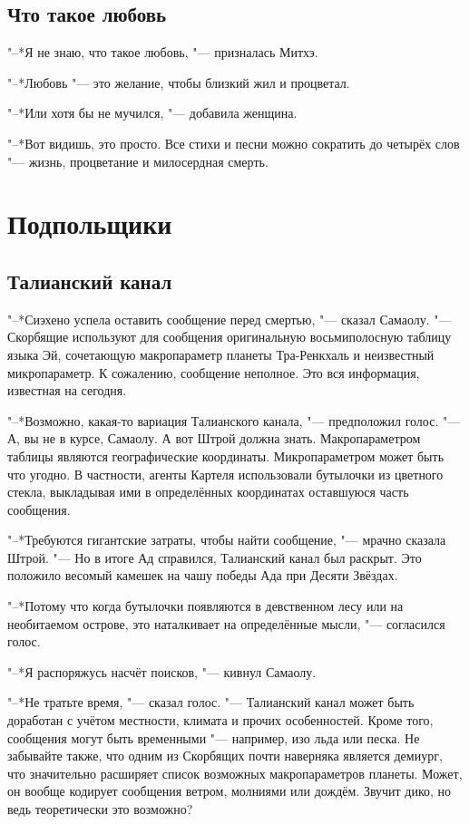 \documentclass[a4paper,10pt]{book}
\begin{document}
\section{Что такое любовь}

"--*Я не знаю, что такое любовь, "--- призналась Митхэ.

"--*Любовь "--- это желание, чтобы близкий жил и процветал.

"--*Или хотя бы не мучился, "--- добавила женщина.

"--*Вот видишь, это просто. Все стихи и песни можно сократить до четырёх слов 
"--- жизнь, процветание и милосердная смерть.


\chapter{Подпольщики}

\section{Талианский канал}

"--*Сиэхено успела оставить сообщение перед смертью, "--- сказал Самаолу. "--- Скорбящие используют для сообщения оригинальную восьмиполосную таблицу языка Эй, сочетающую макропараметр планеты Тра-Ренкхаль и неизвестный микропараметр. К сожалению, сообщение неполное. Это вся информация, известная на сегодня.

"--*Возможно, какая-то вариация Талианского канала, "--- предположил голос. "--- А, вы не в курсе, Самаолу. А вот Штрой должна знать. Макропараметром таблицы являются географические координаты. Микропараметром может быть что угодно. В частности, агенты Картеля использовали бутылочки из цветного стекла, выкладывая ими в определённых координатах оставшуюся часть сообщения.

"--*Требуются гигантские затраты, чтобы найти сообщение, "--- мрачно сказала Штрой. "--- Но в итоге Ад справился, Талианский канал был раскрыт. Это положило весомый камешек на чашу победы Ада при Десяти Звёздах.

"--*Потому что когда бутылочки появляются в девственном лесу или на необитаемом острове, это наталкивает на определённые мысли, "--- согласился голос.

"--*Я распоряжусь насчёт поисков, "--- кивнул Самаолу.

"--*Не тратьте время, "--- сказал голос. "--- Талианский канал может быть доработан с учётом местности, климата и прочих особенностей. Кроме того, сообщения могут быть временными "--- например, изо льда или песка. Не забывайте также, что одним из Скорбящих почти наверняка является демиург, что значительно расширяет список возможных макропараметров планеты. Может, он вообще кодирует сообщения ветром, молниями или дождём. Звучит дико, но ведь теоретически это возможно? 
\end{document}

